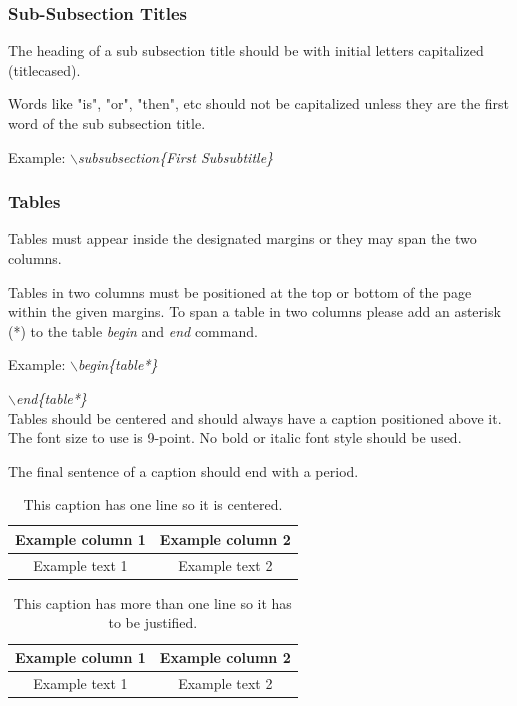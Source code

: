 \documentclass[a4paper,twoside]{article}
\begin{document}
\subsubsection{Sub-Subsection Titles}

The heading of a sub subsection title should be with initial letters
capitalized (titlecased).

Words like "is", "or", "then", etc should not be capitalized unless
they are the first word of the sub subsection title.

Example: \textit{$\backslash$subsubsection\{First Subsubtitle\}}

\subsubsection{Tables}

Tables must appear inside the designated margins or they may span
the two columns.

Tables in two columns must be positioned at the top or bottom of the
page within the given margins. To span a table in two columns please add an asterisk (*) to the table \textit{begin} and \textit{end} command.

Example: \textit{$\backslash$begin\{table*\}}

\hspace*{1.5cm}\textit{$\backslash$end\{table*\}}\\

Tables should be centered and should always have a caption
positioned above it. The font size to use is 9-point. No bold or
italic font style should be used.

The final sentence of a caption should end with a period.

\begin{table}[h]
\caption{This caption has one line so it is
centered.}\label{tab:example1} \centering
\begin{tabular}{|c|c|}
  \hline
  Example column 1 & Example column 2 \\
  \hline
  Example text 1 & Example text 2 \\
  \hline
\end{tabular}
\end{table}

\begin{table}[h]
\vspace{-0.2cm}
\caption{This caption has more than one line so it has to be
justified.}\label{tab:example2} \centering
\begin{tabular}{|c|c|}
  \hline
  Example column 1 & Example column 2 \\
  \hline
  Example text 1 & Example text 2 \\
  \hline
\end{tabular}
\end{table}
\end{document}
